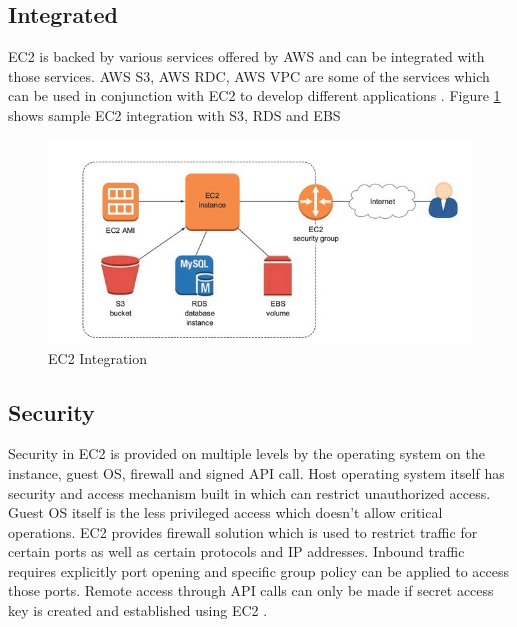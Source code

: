 \subsection{Integrated}
EC2 is backed by various services offered by AWS and can be integrated with those services. AWS S3, AWS RDC, AWS VPC are some of the services which can be used in conjunction with EC2 to develop different applications \cite{www-aws-ec2}.
Figure \ref{f:ec2-integration} shows sample EC2 integration with S3, RDS and EBS 
\begin{figure}[!ht]
  \centering\includegraphics[width=\columnwidth]{images/ec2Integration.PNG}
  \caption{EC2 Integration \cite{www-medium-aws}}\label{f:ec2-integration}
\end{figure}

\subsection{Security}
Security in EC2 is provided on multiple levels by the operating system on the instance, guest OS, firewall and signed API call. Host operating system itself has security and access mechanism built in which can restrict unauthorized access. Guest OS itself is the less privileged access which doesn't allow critical operations. EC2 provides firewall solution which is used to restrict traffic for certain ports as well as certain protocols and IP addresses. Inbound traffic requires explicitly port opening and specific group policy can be applied to access those ports. Remote access through API calls can only be made if secret access key is created and established using EC2 \cite{www-aws-ec2Security}.

